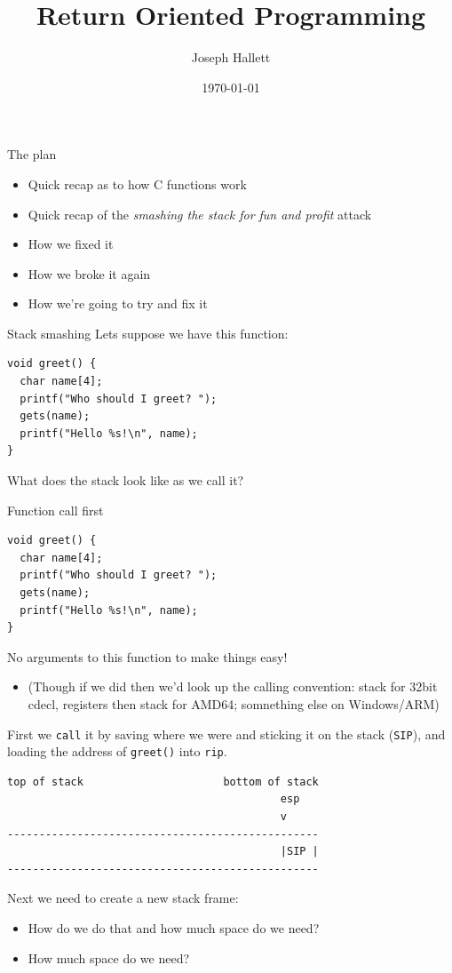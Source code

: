 \documentclass[9pt,aspectratio=169]{beamer}
\author{Joseph Hallett}
\date{\today}
\title{Return Oriented Programming}
\begin{document}
\maketitle

\begin{frame}[label={sec:org924412d}]{The plan}
\begin{itemize}
\item Quick recap as to how C functions work
\item Quick recap of the \emph{smashing the stack for fun and profit} attack
\item How we fixed it
\item How we broke it again
\item How we're going to try and fix it
\end{itemize}
\end{frame}

\begin{frame}[label={sec:org15ac23b},fragile]{Stack smashing}
 Lets suppose we have this function:

\begin{verbatim}
void greet() {
  char name[4];
  printf("Who should I greet? ");
  gets(name);
  printf("Hello %s!\n", name);
}
\end{verbatim}

What does the stack look like as we call it?
\end{frame}

\begin{frame}[label={sec:orgca64c12},fragile]{Function call first}
 \begin{verbatim}
void greet() {
  char name[4];
  printf("Who should I greet? ");
  gets(name);
  printf("Hello %s!\n", name);
}
\end{verbatim}

No arguments to this function to make things easy!
\begin{itemize}
\item (Though if we did then we'd look up the calling convention: stack for 32bit cdecl, registers then stack for AMD64; somnething else on Windows/ARM)
\end{itemize}
First we \texttt{call} it by saving where we were and sticking it on the stack (\texttt{SIP}), and loading the address of \texttt{greet()} into \texttt{rip}.

\begin{verbatim}
top of stack                      bottom of stack
                                           esp
                                           v
-------------------------------------------------
                                           |SIP |
-------------------------------------------------
\end{verbatim}

Next we need to create a new stack frame:
\begin{itemize}
\item How do we do that and how much space do we need?
\item How much space do we need?
\end{itemize}
\end{frame}
\end{document}

